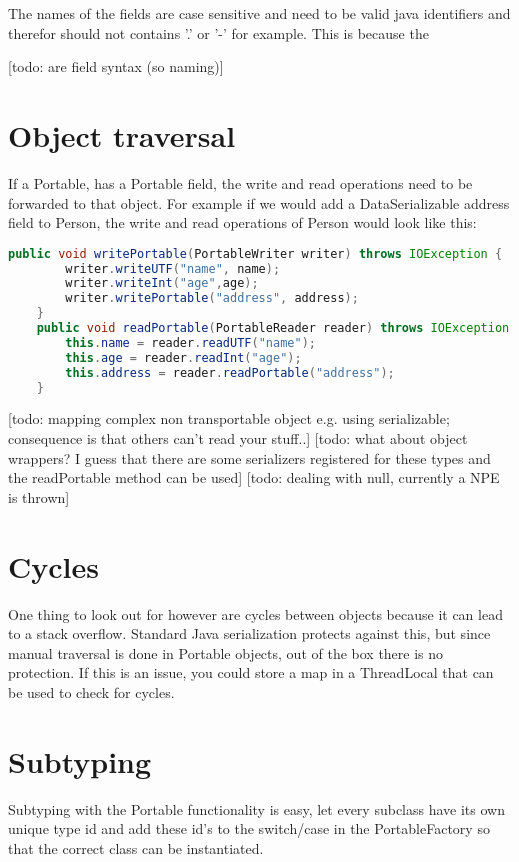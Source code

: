 The names of the fields are case sensitive and need to be valid java identifiers and therefor should not contains '.' or '-' for example. This is because the 

[todo: are field syntax (so naming)]

\section{Object traversal}
If a Portable, has a Portable field, the write and read operations need to be forwarded to that object. For example if we would add a DataSerializable address field to Person, the write and read operations of Person would look like this:
\begin{lstlisting}[language=java]
    public void writePortable(PortableWriter writer) throws IOException {
        writer.writeUTF("name", name);
        writer.writeInt("age",age);
        writer.writePortable("address", address);
    }
    public void readPortable(PortableReader reader) throws IOException {
        this.name = reader.readUTF("name");
        this.age = reader.readInt("age");
        this.address = reader.readPortable("address");
    }
\end{lstlisting}
[todo: mapping complex non transportable object e.g. using serializable; consequence is that others can't read your stuff..]
[todo: what about object wrappers? I guess that there are some serializers registered for these types and the readPortable method can be used]
[todo: dealing with null, currently a NPE is thrown]

\section{Cycles}
One thing to look out for however are cycles between objects because it can lead to a stack overflow. Standard Java serialization protects against this, but since manual traversal is done in Portable objects, out of the box there is no protection. If this is an issue, you could store a map in a ThreadLocal that can be used to check for cycles.

\section{Subtyping}
Subtyping with the Portable functionality is easy, let every subclass have its own unique type id and add these id's to the switch/case in the PortableFactory so that the correct class can be instantiated. 

